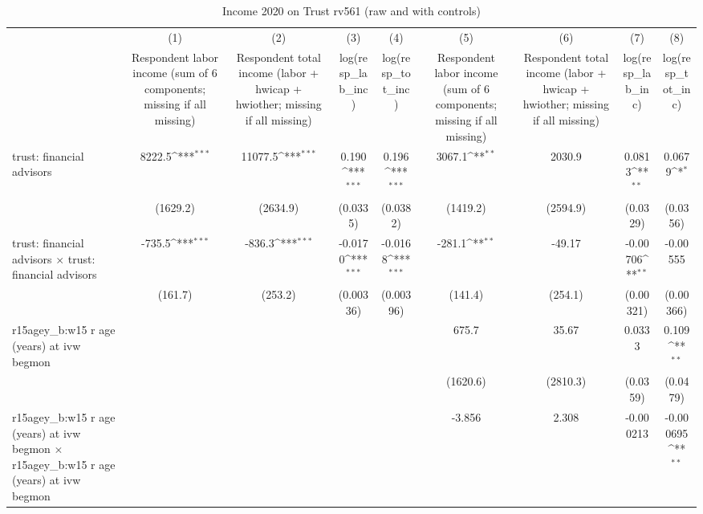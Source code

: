 \begin{table}[htbp]\centering
\def\sym#1{\ifmmode^{#1}\else\(^{#1}\)\fi}
\caption{Income 2020 on Trust rv561 (raw and with controls)}
\begin{tabular}{l*{8}{c}}
\toprule
                &\multicolumn{1}{c}{(1)}&\multicolumn{1}{c}{(2)}&\multicolumn{1}{c}{(3)}&\multicolumn{1}{c}{(4)}&\multicolumn{1}{c}{(5)}&\multicolumn{1}{c}{(6)}&\multicolumn{1}{c}{(7)}&\multicolumn{1}{c}{(8)}\\
                &\multicolumn{1}{c}{Respondent labor income (sum of 6 components; missing if all missing)}&\multicolumn{1}{c}{Respondent total income (labor + hwicap + hwiother; missing if all missing)}&\multicolumn{1}{c}{log(resp\_lab\_inc)}&\multicolumn{1}{c}{log(resp\_tot\_inc)}&\multicolumn{1}{c}{Respondent labor income (sum of 6 components; missing if all missing)}&\multicolumn{1}{c}{Respondent total income (labor + hwicap + hwiother; missing if all missing)}&\multicolumn{1}{c}{log(resp\_lab\_inc)}&\multicolumn{1}{c}{log(resp\_tot\_inc)}\\
\midrule
trust: financial advisors&   8222.5\sym{***}&  11077.5\sym{***}&    0.190\sym{***}&    0.196\sym{***}&   3067.1\sym{**} &   2030.9         &   0.0813\sym{**} &   0.0679\sym{*}  \\
                & (1629.2)         & (2634.9)         & (0.0335)         & (0.0382)         & (1419.2)         & (2594.9)         & (0.0329)         & (0.0356)         \\
\addlinespace
trust: financial advisors $\times$ trust: financial advisors&   -735.5\sym{***}&   -836.3\sym{***}&  -0.0170\sym{***}&  -0.0168\sym{***}&   -281.1\sym{**} &   -49.17         & -0.00706\sym{**} & -0.00555         \\
                &  (161.7)         &  (253.2)         &(0.00336)         &(0.00396)         &  (141.4)         &  (254.1)         &(0.00321)         &(0.00366)         \\
\addlinespace
r15agey\_b:w15 r age (years) at ivw begmon&                  &                  &                  &                  &    675.7         &    35.67         &   0.0333         &    0.109\sym{**} \\
                &                  &                  &                  &                  & (1620.6)         & (2810.3)         & (0.0359)         & (0.0479)         \\
\addlinespace
r15agey\_b:w15 r age (years) at ivw begmon $\times$ r15agey\_b:w15 r age (years) at ivw begmon&                  &                  &                  &                  &   -3.856         &    2.308         &-0.000213         &-0.000695\sym{**} \\

\end{tabular}
\end{table}
